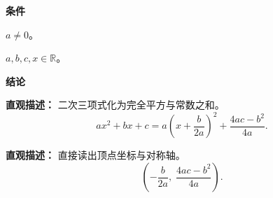 \begin{statementbox}
	\textbf{\textcolor{CStatement}{条件}}
	\begin{description}[style=nextline, leftmargin=2.8em, labelsep=0.5em, itemsep=0.35em]
		\item[\textbf{\textcolor{CStatement}{条件1（二次项非零）：}}] $a \neq 0$。
		\item[\textbf{\textcolor{CStatement}{条件2（全体实数）：}}] $a,b,c,x \in \mathbb{R}$。
	\end{description}

	\textbf{\textcolor{CStatement}{结论}}
	\begin{description}[style=nextline, leftmargin=2.8em, labelsep=0.5em, itemsep=0.45em]
		\item[\textbf{\textcolor{CStatement}{结论一（配方恒等式）：}}]
			\textbf{\textcolor{CStatement}{直观描述：}}
			二次三项式化为完全平方与常数之和。
			\[
				\boxed{ax^{2}+bx+c = a\left(x+\frac{b}{2a}\right)^{2} + \frac{4ac-b^{2}}{4a}}.
			\]

		\item[\textbf{\textcolor{CStatement}{推广结论（顶点坐标）：}}]
			\textbf{\textcolor{CStatement}{直观描述：}}
			直接读出顶点坐标与对称轴。
			\[
				\left(-\frac{b}{2a},\; \frac{4ac-b^{2}}{4a}\right).
			\]
	\end{description}
\end{statementbox}
